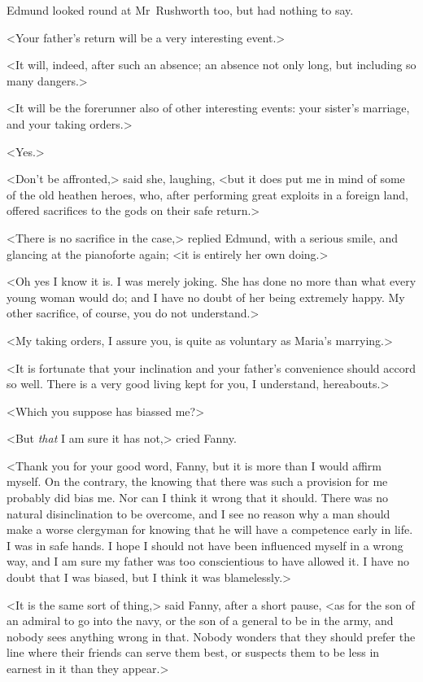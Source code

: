 Edmund looked round at Mr~Rushworth too, but had nothing to say.

<Your father's return will be a very interesting event.>

<It will, indeed, after such an absence; an absence not only long, but including so many dangers.>

<It will be the forerunner also of other interesting events: your sister's marriage, and your taking orders.>

<Yes.>

<Don't be affronted,> said she, laughing, <but it does put me in mind of some of the old heathen heroes, who, after performing great exploits in a foreign land, offered sacrifices to the gods on their safe return.>

<There is no sacrifice in the case,> replied Edmund, with a serious smile, and glancing at the pianoforte again; <it is entirely her own doing.>

<Oh yes I know it is. I was merely joking. She has done no more than what every young woman would do; and I have no doubt of her being extremely happy. My other sacrifice, of course, you do not understand.>

<My taking orders, I assure you, is quite as voluntary as Maria's marrying.>

<It is fortunate that your inclination and your father's convenience should accord so well. There is a very good living kept for you, I understand, hereabouts.>

<Which you suppose has biassed me?>

<But \textit{that}  I am sure it has not,> cried Fanny.

<Thank you for your good word, Fanny, but it is more than I would affirm myself. On the contrary, the knowing that there was such a provision for me probably did bias me. Nor can I think it wrong that it should. There was no natural disinclination to be overcome, and I see no reason why a man should make a worse clergyman for knowing that he will have a competence early in life. I was in safe hands. I hope I should not have been influenced myself in a wrong way, and I am sure my father was too conscientious to have allowed it. I have no doubt that I was biased, but I think it was blamelessly.>

<It is the same sort of thing,> said Fanny, after a short pause, <as for the son of an admiral to go into the navy, or the son of a general to be in the army, and nobody sees anything wrong in that. Nobody wonders that they should prefer the line where their friends can serve them best, or suspects them to be less in earnest in it than they appear.>

